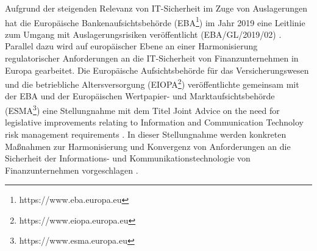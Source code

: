 \bigbreak
Aufgrund der steigenden Relevanz von IT-Sicherheit im Zuge von Auslagerungen hat die \glqq{}Europäische Bankenaufsichtsbehörde\grqq{} (EBA\footnote{https://www.eba.europa.eu}) im Jahr 2019 eine Leitlinie zum Umgang mit Auslagerungsrisiken veröffentlicht (EBA/GL/2019/02) \autocite{eba_leitlinien_konvergenzkriterien}. Parallel dazu wird auf europäischer Ebene an einer Harmonisierung regulatorischer Anforderungen an die IT-Sicherheit von Finanzunternehmen in Europa gearbeitet. Die \glqq{}Europäische Aufsichtsbehörde für das Versicherungswesen und die betriebliche Altersversorgung\grqq{} (EIOPA\footnote{https://www.eiopa.europa.eu}) veröffentlichte gemeinsam mit der EBA und der \glqq{}Europäischen Wertpapier- und Marktaufsichtsbehörde\grqq{} (ESMA\footnote{https://www.esma.europa.eu}) eine Stellungnahme mit dem Titel \glqq{}Joint Advice on the need for legislative improvements relating to Information and Communication Technoloy risk management requirements\grqq{} \autocite{european_banking_authority_2019}. 
In dieser Stellungnahme werden konkreten Maßnahmen zur Harmonisierung und Konvergenz von Anforderungen an die Sicherheit der Informations- und Kommunikationstechnologie von Finanzunternehmen vorgeschlagen \autocite{Bafin2019}. 

